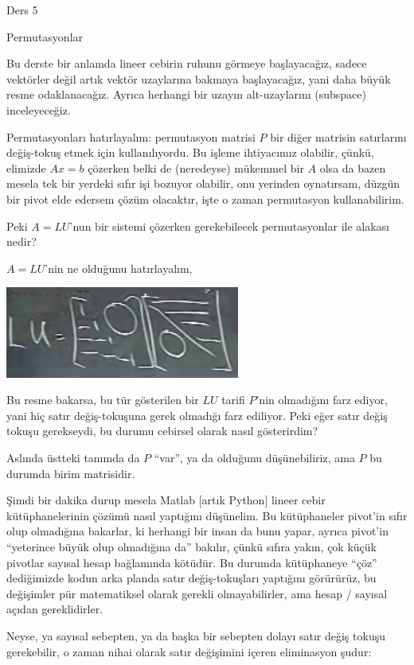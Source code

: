 \documentclass[12pt,fleqn]{article}\usepackage{../../common}
\begin{document}
Ders 5

Permutasyonlar

Bu derste bir anlamda lineer cebirin ruhunu görmeye başlayacağız, sadece
vektörler değil artık vektör uzaylarına bakmaya başlayacağız, yani daha
büyük resme odaklanacağız. Ayrıca herhangi bir uzayın alt-uzaylarını
(subspace) inceleyeceğiz. 

Permutasyonları hatırlayalım: permutasyon matrisi $P$ bir diğer matrisin
satırlarını değiş-tokuş etmek için kullanılıyordu. Bu işleme ihtiyacımız
olabilir, çünkü, elimizde $Ax=b$ çözerken belki de (neredeyse) mükemmel bir
$A$ olsa da bazen mesela tek bir yerdeki sıfır işi bozuyor olabilir, onu
yerinden oynatırsam, düzgün bir pivot elde edersem çözüm olacaktır, işte o
zaman permutasyon kullanabilirim.

Peki $A=LU$'nun bir sistemi çözerken gerekebilecek permutasyonlar ile
alakası nedir?

$A=LU$'nin ne olduğunu hatırlayalım, 

\includegraphics[height=3cm]{5_01.png}

Bu resme bakarsa, bu tür gösterilen bir $LU$ tarifi $P$'nin olmadığını
farz ediyor, yani hiç satır değiş-tokuşuna gerek olmadığı farz
ediliyor. Peki eğer satır değiş tokuşu gerekseydi, bu durumu cebirsel
olarak nasıl gösterirdim?

Aslında üstteki tanımda da $P$ ``var'', ya da olduğunu düşünebiliriz, ama
$P$ bu durumda birim matrisidir. 

Şimdi bir dakika durup mesela Matlab [artık Python] lineer cebir
kütüphanelerinin çözümü nasıl yaptığını düşünelim. Bu kütüphaneler pivot'in
sıfır olup olmadığına bakarlar, ki herhangi bir insan da bunu yapar, ayrıca
pivot'in ``yeterince büyük olup olmadığına da'' bakılır, çünkü sıfıra
yakın, çok küçük pivotlar sayısal hesap bağlamında kötüdür. Bu durumda
kütüphaneye ``çöz'' dediğimizde kodun arka planda satır değiş-tokuşları
yaptığını görürürüz, bu değişimler pür matematiksel olarak gerekli
olmayabilirler, ama hesap / sayısal açıdan gereklidirler. 

Neyse, ya sayısal sebepten, ya da başka bir sebepten dolayı satır değiş
tokuşu gerekebilir, o zaman nihai olarak satır değişimini içeren
eliminasyon şudur:
\end{document}
